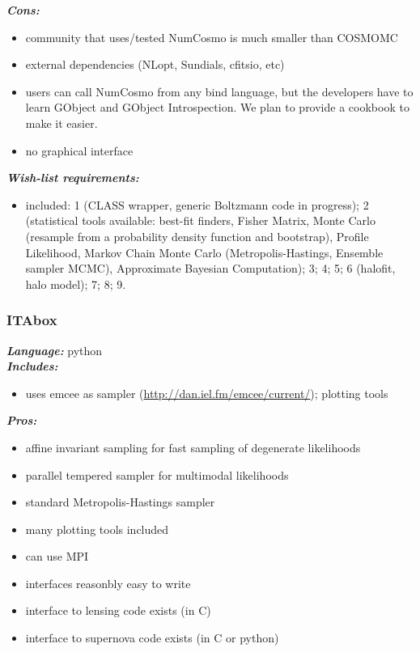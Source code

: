 {\it \bf Cons:} 
\begin{itemize}
 \item 	community that uses/tested NumCosmo is much smaller than COSMOMC
 \item 	external dependencies (NLopt, Sundials, cfitsio, etc)
 \item 	users can call NumCosmo from any bind language, but the developers have to learn GObject and GObject Introspection. We plan to provide a cookbook to make it easier.
 \item 	no graphical interface
 \end{itemize}

{\it \bf Wish-list requirements: }
\begin{itemize}
 \item included: 1 (CLASS wrapper, generic Boltzmann code in progress); 2 (statistical tools available: best-fit finders, Fisher Matrix,  Monte Carlo (resample from a probability density function and bootstrap), Profile Likelihood, Markov Chain Monte Carlo (Metropolis-Hastings, Ensemble sampler MCMC), Approximate Bayesian Computation); 3; 4; 5; 6 (halofit, halo model); 7; 8; 9.
\end{itemize}

\newpage
\subsubsection{ITAbox} 



{\it \bf Language:} python\\

{\it \bf Includes:}
\begin{itemize}
\item uses emcee as sampler (\url{http://dan.iel.fm/emcee/current/}); plotting tools
\end{itemize}

{\it \bf Pros:} 
\begin{itemize}
 \item affine invariant sampling for fast sampling of degenerate likelihoods
 \item parallel tempered sampler for multimodal likelihoods
 \item standard Metropolis-Hastings sampler
 \item many plotting tools included
 \item can use MPI
 \item interfaces reasonbly easy to write
 \item interface to lensing code exists (in C)
 \item interface to supernova code exists (in C or python)
 \end{itemize}


